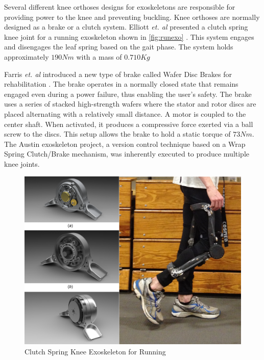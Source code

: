Several different knee orthoses designs for exoskeletons are responsible for providing power to the knee and preventing buckling. Knee orthoses are normally designed as a brake or a clutch system. Elliott \textit{et. al} presented a clutch spring knee joint for a running exoskeleton shown in \autoref{fig:runexo} \cite{elliott2014design}. This system engages and disengages the leaf spring based on the gait phase. The system holds approximately $190Nm$ with a mass of $0.710Kg$

Farris \textit{et. al} introduced a new type of brake called Wafer Disc Brakes for rehabilitation \cite{farris2009design}. The brake operates in a normally closed state that remains engaged even during a power failure, thus enabling the user's safety. The brake uses a series of stacked high-strength wafers where the stator and rotor discs are placed alternating with a relatively small distance. A motor is coupled to the center shaft. When activated, it produces a compressive force exerted via a ball screw to the discs. This setup allows the brake to hold a static torque of $73Nm$. The Austin exoskeleton project, a version control technique based on a Wrap Spring Clutch/Brake mechanism, was inherently executed to produce multiple knee joints.
 
 
 \begin{figure}[h]
    \centering
    \includegraphics[scale=0.30, frame]{images/background/clutch.png}
    \caption[Clutch Spring Knee]{Clutch Spring Knee Exoskeleton for Running \cite{elliott2014design}}
    \label{fig:runexo}
\end{figure} 


